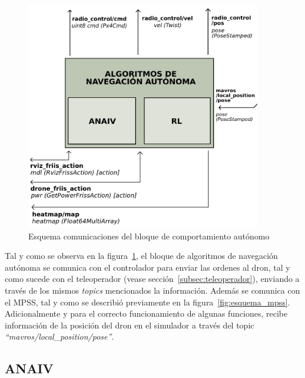 \begin{figure} [tp]
    \begin{center}
    \includegraphics[height=10cm]{imagenes/cap4/5_esquema_comp_auto.png}
    \end{center}
	\caption[Esquema comunicaciones del bloque de comportamiento autónomo]{Esquema comunicaciones del bloque de comportamiento autónomo}
	\label{fig:esquema_auto}
\end{figure}

Tal y como se observa en la figura~\ref{fig:esquema_auto}, el bloque de algoritmos de navegación autónoma se comunica con el controlador para enviar las ordenes al dron, tal y como sucede con el teleoperador (vease sección~\ref{subsec:teleoperador}), enviando a través de los mismos \emph{topics} mencionados la información. Además se comunica con el \ac{MPSS}, tal y como se describió previamente en la figura~\ref{fig:esquema_mpss}. Adicionalmente y para el correcto funcionamiento de algunas funciones, recibe información de la posición del dron en el simulador a través del topic \emph{``mavros/local\_position/pose''}.

\subsection{\ac{ANAIV}}
\label{subsec:algoritmo_sf}

